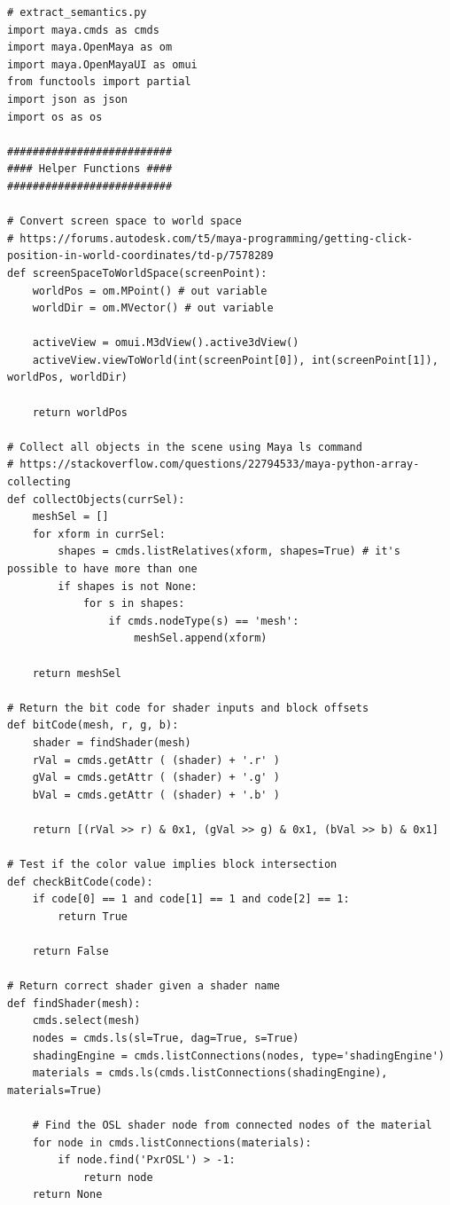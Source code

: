\documentclass[conference]{IEEEtran}
\begin{document}
{\bigskip

\begin{verbatim}
# extract_semantics.py
import maya.cmds as cmds
import maya.OpenMaya as om
import maya.OpenMayaUI as omui
from functools import partial
import json as json
import os as os

##########################
#### Helper Functions ####
##########################

# Convert screen space to world space
# https://forums.autodesk.com/t5/maya-programming/getting-click-position-in-world-coordinates/td-p/7578289
def screenSpaceToWorldSpace(screenPoint):
    worldPos = om.MPoint() # out variable
    worldDir = om.MVector() # out variable
    
    activeView = omui.M3dView().active3dView()
    activeView.viewToWorld(int(screenPoint[0]), int(screenPoint[1]), worldPos, worldDir)
    
    return worldPos

# Collect all objects in the scene using Maya ls command
# https://stackoverflow.com/questions/22794533/maya-python-array-collecting
def collectObjects(currSel):
    meshSel = []
    for xform in currSel:
        shapes = cmds.listRelatives(xform, shapes=True) # it's possible to have more than one
        if shapes is not None:
            for s in shapes:
                if cmds.nodeType(s) == 'mesh':
                    meshSel.append(xform)
  
    return meshSel
    
# Return the bit code for shader inputs and block offsets
def bitCode(mesh, r, g, b):
    shader = findShader(mesh)
    rVal = cmds.getAttr ( (shader) + '.r' )
    gVal = cmds.getAttr ( (shader) + '.g' )
    bVal = cmds.getAttr ( (shader) + '.b' ) 
    
    return [(rVal >> r) & 0x1, (gVal >> g) & 0x1, (bVal >> b) & 0x1]

# Test if the color value implies block intersection
def checkBitCode(code):
    if code[0] == 1 and code[1] == 1 and code[2] == 1:
        return True
        
    return False

# Return correct shader given a shader name
def findShader(mesh):
    cmds.select(mesh)
    nodes = cmds.ls(sl=True, dag=True, s=True)
    shadingEngine = cmds.listConnections(nodes, type='shadingEngine')
    materials = cmds.ls(cmds.listConnections(shadingEngine), materials=True)
    
    # Find the OSL shader node from connected nodes of the material
    for node in cmds.listConnections(materials):
        if node.find('PxrOSL') > -1:
            return node
    return None


\end{verbatim}}
\end{document}
